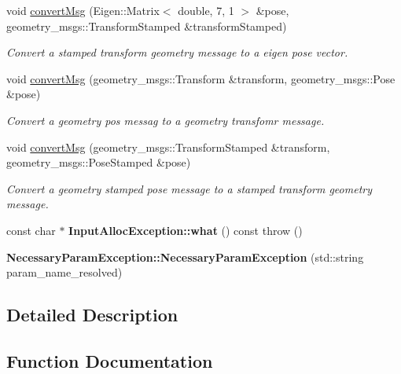 \begin{DoxyCompactItemize}
void \hyperlink{group__MultiRobotController_ga21e894dfe1e1216355db06776a630b09}{convert\+Msg} (Eigen\+::\+Matrix$<$ double, 7, 1 $>$ \&pose, geometry\+\_\+msgs\+::\+Transform\+Stamped \&transform\+Stamped)
\begin{DoxyCompactList}\small\item\em Convert a stamped transform geometry message to a eigen pose vector. \end{DoxyCompactList}\item 
void \hyperlink{group__MultiRobotController_ga27bedbf17c4aa6e228239ef1f1009e2b}{convert\+Msg} (geometry\+\_\+msgs\+::\+Transform \&transform, geometry\+\_\+msgs\+::\+Pose \&pose)
\begin{DoxyCompactList}\small\item\em Convert a geometry pos messag to a geometry transfomr message. \end{DoxyCompactList}\item 
void \hyperlink{group__MultiRobotController_ga83f417b8e164774e4926508549543498}{convert\+Msg} (geometry\+\_\+msgs\+::\+Transform\+Stamped \&transform, geometry\+\_\+msgs\+::\+Pose\+Stamped \&pose)
\begin{DoxyCompactList}\small\item\em Convert a geometry stamped pose message to a stamped transform geometry message. \end{DoxyCompactList}\item 
\mbox{\label{group__MultiRobotController_gaa948b5d25acee95c1d39f1e1276304b8}} 
const char $\ast$ {\bfseries Input\+Alloc\+Exception\+::what} () const  throw ()
\item 
\mbox{\label{group__MultiRobotController_ga7c6066c92d689e7946e49425c2efef62}} 
{\bfseries Necessary\+Param\+Exception\+::\+Necessary\+Param\+Exception} (std\+::string param\+\_\+name\+\_\+resolved)
\end{DoxyCompactItemize}


\subsection{Detailed Description}


\subsection{Function Documentation}
\mbox{\label{group__MultiRobotController_ga465b07e16106af072ed5315010fa876c}} 
